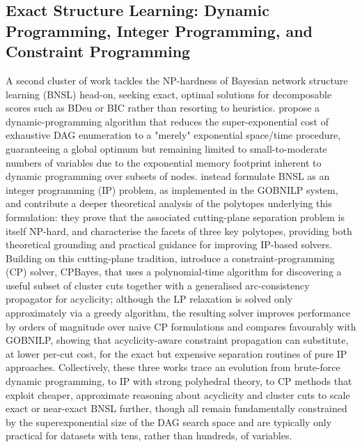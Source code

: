 \subsection{Exact Structure Learning: Dynamic Programming, Integer Programming, and Constraint Programming}
A second cluster of work tackles the NP-hardness of Bayesian network structure learning (BNSL) head-on, seeking exact, optimal solutions for decomposable scores such as BDeu or BIC rather than resorting to heuristics. \cite{singh2018finding} propose a dynamic-programming algorithm that reduces the super-exponential cost of exhaustive DAG enumeration to a "merely" exponential space/time procedure, guaranteeing a global optimum but remaining limited to small-to-moderate numbers of variables due to the exponential memory footprint inherent to dynamic programming over subsets of nodes. \cite{cussens2017bayesian} instead formulate BNSL as an integer programming (IP) problem, as implemented in the GOBNILP system, and contribute a deeper theoretical analysis of the polytopes underlying this formulation: they prove that the associated cutting-plane separation problem is itself NP-hard, and characterise the facets of three key polytopes, providing both theoretical grounding and practical guidance for improving IP-based solvers. Building on this cutting-plane tradition, \cite{trosser2021improved} introduce a constraint-programming (CP) solver, CPBayes, that uses a polynomial-time algorithm for discovering a useful subset of cluster cuts together with a generalised arc-consistency propagator for acyclicity; although the LP relaxation is solved only approximately via a greedy algorithm, the resulting solver improves performance by orders of magnitude over naive CP formulations and compares favourably with GOBNILP, showing that acyclicity-aware constraint propagation can substitute, at lower per-cut cost, for the exact but expensive separation routines of pure IP approaches. Collectively, these three works trace an evolution from brute-force dynamic programming, to IP with strong polyhedral theory, to CP methods that exploit cheaper, approximate reasoning about acyclicity and cluster cuts to scale exact or near-exact BNSL further, though all remain fundamentally constrained by the superexponential size of the DAG search space and are typically only practical for datasets with tens, rather than hundreds, of variables.

